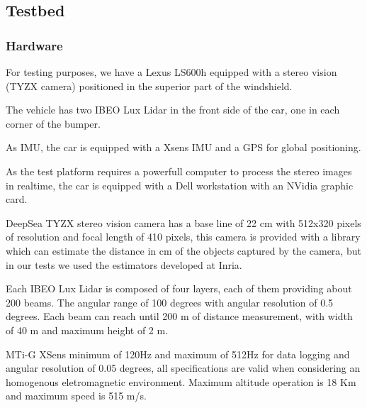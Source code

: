 \documentclass{llncs}
\begin{document}
\subsection{Testbed}

\subsubsection*{Hardware}

For testing purposes, we have a Lexus LS600h equipped with a stereo vision (TYZX camera) positioned in the superior part of the windshield.

The vehicle has two IBEO Lux Lidar in the front side of the car, one in each corner of the bumper.

As IMU, the car is equipped with a Xsens IMU and a GPS for global positioning.

As the test platform requires a powerfull computer to process the stereo images in realtime, the car is equipped with a Dell workstation with an NVidia graphic card.

DeepSea TYZX stereo vision camera has a base line of 22 cm with 512x320 pixels of resolution and focal length of 410 pixels, this camera is provided with a library which can estimate the distance in cm of the objects captured by the camera, but in our tests we used the estimators developed at Inria\cite{PERROLLAZ-2010-493397}.

Each IBEO Lux Lidar is composed of four layers, each of them providing about 200 beams. The angular range of 100 degrees with angular resolution of 0.5 degrees. Each beam can reach until 200 m of distance measurement, with width of 40 m and maximum height of 2 m.

MTi-G XSens minimum of 120Hz and maximum of 512Hz for data logging and angular resolution of 0.05 degrees, all specifications are valid when considering an homogenous eletromagnetic environment. Maximum altitude operation is 18 Km and maximum speed is 515 m/s.
\end{document}
